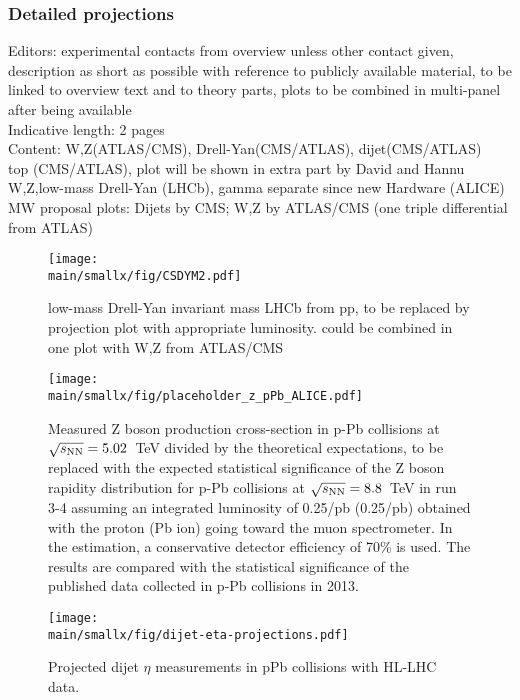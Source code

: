 \documentclass[../report.tex]{subfiles}
\providecommand{\main}{..}
\begin{document}
\subsubsection{Detailed projections}
Editors: experimental contacts from overview unless other contact given, description as short as possible with reference to publicly available material, to be linked to overview text and to theory parts, plots to be combined in multi-panel after being available \\
Indicative length: 2 pages \\
Content: W,Z(ATLAS/CMS), Drell-Yan(CMS/ATLAS), dijet(CMS/ATLAS)\\
top (CMS/ATLAS), plot will be shown in extra part by David and Hannu \\
W,Z,low-mass Drell-Yan (LHCb), gamma separate since new Hardware (ALICE) \\
MW proposal plots: Dijets by CMS; W,Z by ATLAS/CMS (one triple differential from ATLAS)\\
\begin{figure}[htb]
\centering
\texttt{[image: \\main/smallx/fig/CSDYM2.pdf]}
\caption{low-mass Drell-Yan invariant mass LHCb from pp, to be replaced by projection plot with appropriate luminosity. could be combined in one plot with W,Z from ATLAS/CMS}
\end{figure}

\begin{figure}[htb]
\centering
\texttt{[image: \\main/smallx/fig/placeholder\_z\_pPb\_ALICE.pdf]}
\caption{Measured Z boson production cross-section in p-Pb collisions at $\sqrt{s_{\rm NN}} = 5.02$~TeV divided by the theoretical expectations, to be replaced with the expected statistical significance of the Z boson rapidity distribution for p-Pb collisions at $\sqrt{s_{\rm NN}} = 8.8$~TeV in run 3-4 assuming an integrated luminosity of 0.25/pb (0.25/pb) obtained with the proton (Pb ion) going toward the muon spectrometer. In the estimation, a conservative detector efficiency of 70\% is used. The results are compared with the statistical significance of the published data collected in p-Pb collisions in 2013.}
\end{figure}

\begin{figure}[t] %
\centering{} 
\texttt{[image: \\main/smallx/fig/dijet-eta-projections.pdf]}
\caption{
Projected dijet $\eta$ measurements in pPb collisions with HL-LHC data.
\label{fig:dijet-eta-projection-cms}
}
\end{figure}
\end{document}
